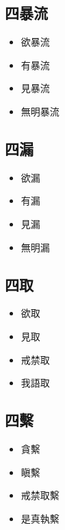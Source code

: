 \subsection{四暴流}
\begin{itemize}
  \item 欲暴流
  \item 有暴流
  \item 見暴流
  \item 無明暴流
\end{itemize}

\subsection{四漏}
\begin{itemize}
  \item 欲漏
  \item 有漏
  \item 見漏
  \item 無明漏
\end{itemize}

\subsection{四取}
\begin{itemize}
  \item 欲取  \item 見取  \item 戒禁取  \item 我語取
\end{itemize}

\subsection{四繫}
\begin{itemize}
  \item 貪繫  \item 瞋繫  \item 戒禁取繫  \item 是真執繫
\end{itemize}
